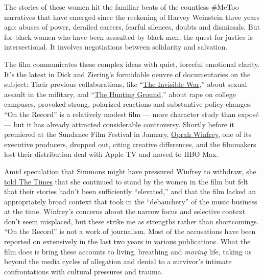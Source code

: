 The stories of these women hit the familiar beats of the countless
\#MeToo narratives that have emerged since the reckoning of Harvey
Weinstein three years ago: abuses of power, derailed careers, fearful
silences, doubts and dismissals. But for black women who have been
assaulted by black men, the quest for justice is intersectional. It
involves negotiations between solidarity and salvation.

The film communicates these complex ideas with quiet, forceful emotional
clarity. It's the latest in Dick and Ziering's formidable oeuvre of
documentaries on the subject: Their previous collaborations, like
``\href{https://www.nytimes3xbfgragh.onion/2012/06/22/movies/the-invisible-war-directed-by-kirby-dick.html}{The
Invisible War},'' about sexual assault in the military, and
``\href{https://www.nytimes3xbfgragh.onion/2015/02/27/movies/review-the-hunting-ground-documentary-a-searing-look-at-campus-rape.html}{The
Hunting Ground},'' about rape on college campuses, provoked strong,
polarized reactions and substantive policy changes. ``On the Record'' is
a relatively modest film --- more character study than exposé --- but it
has already attracted considerable controversy. Shortly before it
premiered at the Sundance Film Festival in January,
\href{https://www.nytimes3xbfgragh.onion/2020/01/11/business/media/oprah-winfrey-documentary-russell-simmons-apple.html}{Oprah
Winfrey}, one of its executive producers, dropped out, citing creative
differences, and the filmmakers lost their distribution deal with Apple
TV and moved to HBO Max.

Amid speculation that Simmons might have pressured Winfrey to withdraw,
\href{https://www.nytimes3xbfgragh.onion/2020/01/17/movies/oprah-winfrey-russell-simmons-movie.html}{she
told The Times} that she continued to stand by the women in the film but
felt that their stories hadn't been sufficiently ``elevated,'' and that
the film lacked an appropriately broad context that took in the
``debauchery'' of the music business at the time. Winfrey's concerns
about the narrow focus and selective context don't seem misplaced, but
these strike me as strengths rather than shortcomings. ``On the Record''
is not a work of journalism. Most of the accusations have been reported
on extensively in the last two years in
\href{https://www.latimes.com/business/hollywood/la-fi-russell-simmons-yoga-20171213-htmlstory.html}{various
publications}. What the film does is bring these accounts to living,
breathing and \emph{moving} life, taking us beyond the media cycles of
allegation and denial to a survivor's intimate confrontations with
cultural pressures and trauma.

